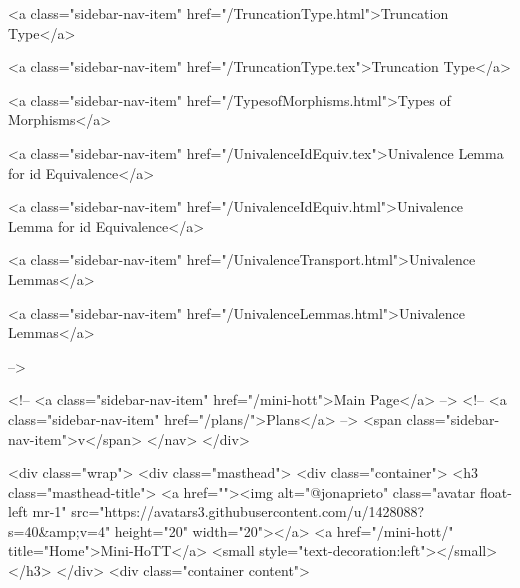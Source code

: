       
        
          <a class="sidebar-nav-item" href="/TruncationType.html">Truncation Type</a>
        
      
    
      
        
          <a class="sidebar-nav-item" href="/TruncationType.tex">Truncation Type</a>
        
      
    
      
        
          <a class="sidebar-nav-item" href="/TypesofMorphisms.html">Types of Morphisms</a>
        
      
    
      
        
          <a class="sidebar-nav-item" href="/UnivalenceIdEquiv.tex">Univalence Lemma for id Equivalence</a>
        
      
    
      
        
          <a class="sidebar-nav-item" href="/UnivalenceIdEquiv.html">Univalence Lemma for id Equivalence</a>
        
      
    
      
        
          <a class="sidebar-nav-item" href="/UnivalenceTransport.html">Univalence Lemmas</a>
        
      
    
      
        
          <a class="sidebar-nav-item" href="/UnivalenceLemmas.html">Univalence Lemmas</a>
        
      
     -->

    <!-- <a class="sidebar-nav-item" href="/mini-hott">Main Page</a> -->
    <!-- <a class="sidebar-nav-item" href="/plans/">Plans</a> -->
    <span class="sidebar-nav-item">v</span>
  </nav>
</div>

    <div class="wrap">
      <div class="masthead">
        <div class="container">
          <h3 class="masthead-title">
            <a href=""><img alt="@jonaprieto" class="avatar float-left mr-1" src="https://avatars3.githubusercontent.com/u/1428088?s=40&amp;v=4" height="20" width="20"></a>
            <a href="/mini-hott/" title="Home">Mini-HoTT</a>
            <small style="text-decoration:left"></small>
          </h3>
        </div>
      <div class="container content">
        







